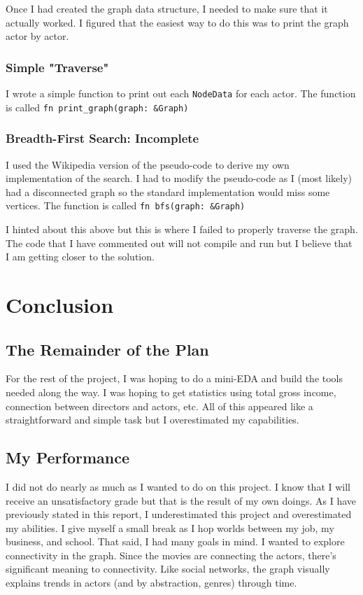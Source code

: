 \documentclass[12pt,letterpaper]{article}
\begin{document}
Once I had created the graph data structure, I needed to make sure that it actually worked.  I figured that the easiest way to do this was to print the graph actor by actor. 

\subsubsection{Simple "Traverse"}

I wrote a simple function to print out each \texttt{NodeData} for each actor.  The function is called \texttt{fn print\_graph(graph: \&Graph)}

\subsubsection{Breadth-First Search: Incomplete}

I used the Wikipedia version of the pseudo-code to derive my own implementation of the search. I had to modify the pseudo-code as I (most likely) had a disconnected graph so the standard implementation would miss some vertices.  The function is called \texttt{fn bfs(graph: \&Graph)}

I hinted about this above but this is where I failed to properly traverse the graph. The code that I have commented out will not compile and run but I believe that I am getting closer to the solution. 

\section{Conclusion}

\subsection{The Remainder of the Plan}

For the rest of the project,  I was hoping to do a mini-EDA and build the tools needed along the way.  I was hoping to get statistics using total gross income, connection between directors and actors, etc. All of this appeared like a straightforward and simple task but I overestimated my capabilities.  

\subsection{My Performance}

I did not do nearly as much as I wanted to do on this project.  I know that I will receive an unsatisfactory grade but that is the result of my own doings.  As I have previously stated in this report,  I underestimated this project and overestimated my abilities.  I give myself a small break as I hop worlds between my job, my business, and school.  That said, I had many goals in mind. I wanted to explore connectivity in the graph. Since the movies are connecting the actors, there's significant meaning to connectivity. Like social networks,  the graph visually explains trends in actors (and by abstraction, genres) through time. 
\end{document}
